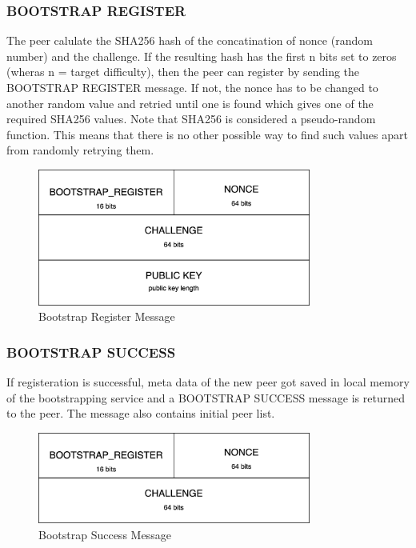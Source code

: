 \subsubsection{BOOTSTRAP REGISTER}

The peer calulate the SHA256 hash of the concatination of nonce (random number) and the challenge. If the resulting hash has the first n bits set to zeros (wheras n = target difficulty), then the peer can register by sending the BOOTSTRAP REGISTER message. If not, the nonce has to be changed to another random value and retried until one is found which gives one of the required SHA256 values. Note that SHA256 is considered a pseudo-random function. This means that there is no other possible way to find such values apart from randomly retrying them.

\begin{figure}[H]
    \centering
    \includegraphics[width=0.8\textwidth]{pics/bootstrap.register.png}
    \caption{Bootstrap Register Message}
\end{figure}

\subsubsection{BOOTSTRAP SUCCESS}

If registeration is successful, meta data of the new peer got saved in local memory of the bootstrapping service and a BOOTSTRAP SUCCESS message is returned to the peer. The message also contains initial peer list.

\begin{figure}[H]
    \centering
    \includegraphics[width=0.8\textwidth]{pics/bootstrap.success.png}
    \caption{Bootstrap Success Message}
\end{figure}

